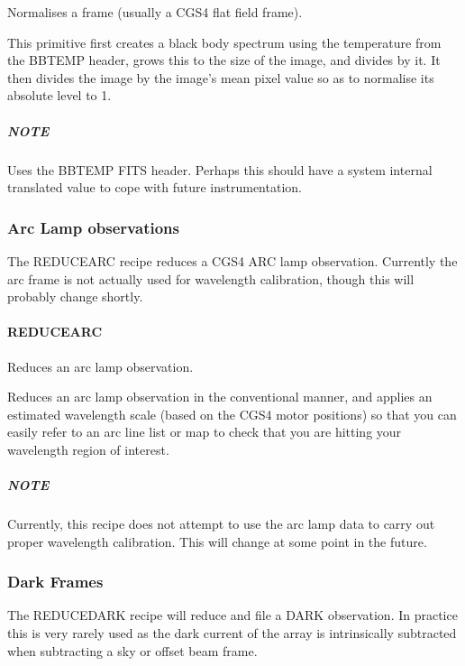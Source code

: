 \documentclass[twoside,11pt]{article}
\renewcommand{\_}{\texttt{\symbol{95}}}
\begin{document}
\mbox{}


Normalises a frame (usually a CGS4 flat field frame).



This primitive first creates a black body spectrum using the temperature
from the BBTEMP header, grows this to the size of the image, and divides by
it. It then divides the image by the image's mean pixel value so as to
normalise its absolute level to 1.

\subparagraph*{NOTE\label{_NORMALISE_FLAT_BY_BB__NOTE}}


Uses the BBTEMP FITS header. Perhaps this should have a system internal
translated value to cope with future instrumentation.


\subsubsection{Arc Lamp observations}

The REDUCE\_ARC recipe reduces a CGS4 ARC lamp observation. Currently
the arc frame is not actually used for wavelength calibration, though
this will probably change shortly.

\paragraph{REDUCE\_ARC\label{REDUCE_ARC}}


Reduces an arc lamp observation.


\mbox{}


Reduces an arc lamp observation in the conventional manner, and
applies an estimated wavelength scale (based on the CGS4 motor
positions) so that you can easily refer to an arc line list or map to
check that you are hitting your wavelength region of interest.

\subparagraph*{NOTE\label{REDUCE_ARC_NOTE}}


Currently, this recipe does not attempt to use the arc lamp data to
carry out proper wavelength calibration. This will change at some
point in the future.


\subsubsection{Dark Frames}

The REDUCE\_DARK recipe will reduce and file a DARK observation. In
practice this is very rarely used as the dark current of the array is
intrinsically subtracted when subtracting a sky or offset beam frame.
\end{document}
